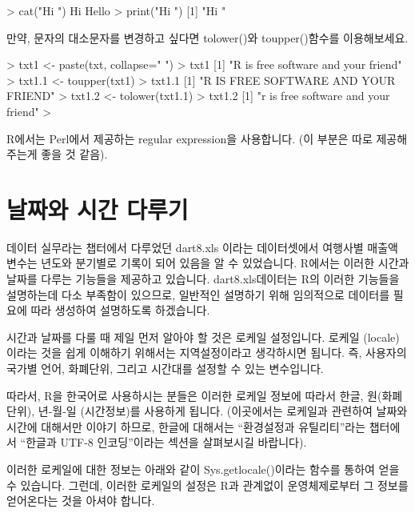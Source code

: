 \begin{Schunk}
\begin{Soutput} 
> cat("Hi \nHello \n")
Hi 
Hello 
> print("Hi \nHello \n")
[1] "Hi \nHello \n"
\end{Soutput}
\end{Schunk}

만약, 문자의 대소문자를 변경하고 싶다면 tolower()와 toupper()함수를 이용해보세요.

\begin{Schunk}
\begin{Soutput} 
> txt1 <- paste(txt, collapse=" ")
> txt1
[1] "R is free software and your friend"
> txt1.1 <- toupper(txt1)
> txt1.1
[1] "R IS FREE SOFTWARE AND YOUR FRIEND"
> txt1.2 <- tolower(txt1.1)
> txt1.2
[1] "r is free software and your friend"
> 
\end{Soutput}
\end{Schunk}

R에서는 Perl에서 제공하는 regular expression을 사용합니다. 
(이 부분은 따로 제공해주는게 좋을 것 같음).
     


\section{날짜와 시간 다루기}

데이터 실무라는 챕터에서 다루었던 dart8.xls 이라는 데이터셋에서 여행사별 매출액 변수는 년도와 분기별로 기록이 되어 있음을 알 수 있었습니다. 
R에서는 이러한 시간과 날짜를 다루는 기능들을 제공하고 있습니다.
dart8.xls데이터는 R의 이러한 기능들을 설명하는데 다소 부족함이 있으므로, 일반적인 설명하기 위해 임의적으로 데이터를 필요에 따라 생성하여 설명하도록 하겠습니다. 

시간과 날짜를 다룰 때 제일 먼저 알아야 할 것은 로케일 설정입니다. 
로케일 (locale)이라는 것을 쉽게 이해하기 위해서는 지역설정이라고 생각하시면 됩니다. 
즉, 사용자의 국가별 언어, 화폐단위, 그리고 시간대를 설정할 수 있는 변수입니다. 

따라서, R을 한국어로 사용하시는 분들은 이러한 로케일 정보에 따라서 한글, 원(화폐단위), 년-월-일 (시간정보)를 사용하게 됩니다. 
(이곳에서는 로케일과 관련하여 날짜와 시간에 대해서만 이야기 하므로, 한글에 대해서는 ``환경설정과 유틸리티''라는 챕터에서 ``한글과 UTF-8 인코딩''이라는 섹션을 살펴보시길 바랍니다).


이러한 로케일에 대한 정보는 아래와 같이 Sys.getlocale()이라는 함수를 통하여 얻을 수 있습니다. 
그런데, 이러한 로케일의 설정은 R과 관계없이 운영체제로부터 그 정보를 얻어온다는 것을 아셔야 합니다. 

